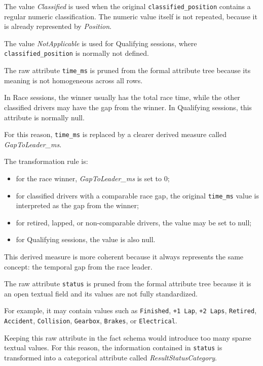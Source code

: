 \documentclass[a4paper,11pt]{article}
\begin{document}
	The value \textit{Classified} is used when the original \texttt{classified\_position}
	contains a regular numeric classification. The numeric value itself is not repeated,
	because it is already represented by \textit{Position}.
	
	The value \textit{NotApplicable} is used for Qualifying sessions, where
	\texttt{classified\_position} is normally not defined.
	
	
	The raw attribute \texttt{time\_ms} is pruned from the formal attribute tree because its
	meaning is not homogeneous across all rows.
	
	In Race sessions, the winner usually has the total race time, while the other classified
	drivers may have the gap from the winner. In Qualifying sessions, this attribute is
	normally null.
	
	For this reason, \texttt{time\_ms} is replaced by a clearer derived measure called
	\textit{GapToLeader\_ms}.
	
	The transformation rule is:
	
	\begin{itemize}
		\item for the race winner, \textit{GapToLeader\_ms} is set to 0;
		\item for classified drivers with a comparable race gap, the original
		\texttt{time\_ms} value is interpreted as the gap from the winner;
		\item for retired, lapped, or non-comparable drivers, the value may be set to null;
		\item for Qualifying sessions, the value is also null.
	\end{itemize}
	
	This derived measure is more coherent because it always represents the same concept:
	the temporal gap from the race leader.
	
	
	The raw attribute \texttt{status} is pruned from the formal attribute tree because it is an
	open textual field and its values are not fully standardized.
	
	For example, it may contain values such as \texttt{Finished}, \texttt{+1 Lap},
	\texttt{+2 Laps}, \texttt{Retired}, \texttt{Accident}, \texttt{Collision},
	\texttt{Gearbox}, \texttt{Brakes}, or \texttt{Electrical}.
	
	Keeping this raw attribute in the fact schema would introduce too many sparse textual
	values. For this reason, the information contained in \texttt{status} is transformed into
	a categorical attribute called \textit{ResultStatusCategory}.
	
\end{document}
